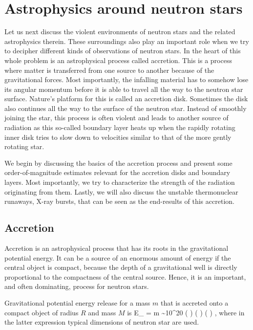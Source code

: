 \chapter{Astrophysics around neutron stars}

Let us next discuss the violent environments of neutron stars and the related astrophysics therein.
These surroundings also play an important role when we try to decipher different kinds of observations of neutron stars.
In the heart of this whole problem is an astrophysical process called accretion.
This is a process where matter is transferred from one source to another because of the gravitational forces.
Most importantly, the infalling material has to somehow lose its angular momentum before it is able to travel all the way to the neutron star surface.
Nature's platform for this is called an accretion disk.
Sometimes the disk also continues all the way to the surface of the neutron star.
Instead of smoothly joining the star, this process is often violent and leads to another source of radiation as this so-called boundary layer heats up when the rapidly rotating inner disk tries to slow down to velocities similar to that of the more gently rotating star.

We begin by discussing the basics of the accretion process and present some order-of-magnitude estimates relevant for the accretion disks and boundary layers.
Most importantly, we try to characterize the strength of the radiation originating from them.
Lastly, we will also discuss the unstable thermonuclear runaways, X-ray bursts, that can be seen as the end-results of this accretion.


\section{Accretion}

Accretion is an astrophysical process that has its roots in the gravitational potential energy.
It can be a source of an enormous amount of energy if the central object is compact, because the depth of a gravitational well is directly proportional to the compactness of the central source.
Hence, it is an important, and often dominating, process for neutron stars.\cite[see e.g.,][]{FKR02}

Gravitational potential energy release for a mass $m$ that is accreted onto a compact object of radius $R$ and mass $M$ is
\be
\Delta E_{} = m  \sim 10^{20} \left(  \right) \left(  \right) \left(  \right) \erg,
\ee
where in the latter expression typical dimensions of neutron star are used.

